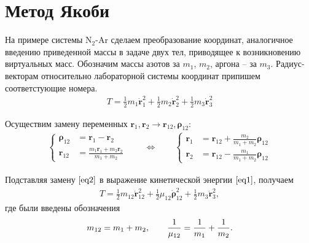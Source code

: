 \documentclass[14pt]{extarticle}
\newcommand{\dvr}{\dot{\mathbf{r}}}
\newcommand{\vr}{\mathbf{r}}
\newcommand{\vrho}{\boldsymbol{\rho}}
\newcommand{\dvrho}{\dot{\boldsymbol{\rho}}}
\begin{document}
\section*{Метод Якоби}

На примере системы N$_2$-Ar сделаем преобразование координат, аналогичное введению приведенной массы в задаче двух тел, приводящее к возникновению виртуальных масс. Обозначим массы азотов за $m_1$, $m_2$, аргона -- за $m_3$. Радиус-векторам относительно лабораторной системы координат припишем соответстующие номера. 
\begin{gather}
		T = \frac{1}{2} m_1 \dvr_1^2 + \frac{1}{2} m_2 \dvr_2^2 + \frac{1}{2} m_3 \dvr_3^2 \label{eq1}
\end{gather}

Осуществим замену переменных $\vr_1, \vr_2 \longrightarrow \vr_{12}, \vrho_{12}$:
\begin{gather}
	\left\{
	\begin{aligned}
		\vrho_{12} &= \vr_1 - \vr_2 \\
		\vr_{12} &= \frac{m_1 \vr_1 + m_2 \vr_2}{m_1 + m_2} 
	\end{aligned}
	\right. \quad \quad \Longleftrightarrow \quad \quad 
	\left\{
	\begin{aligned}
		\vr_1 &= \vr_{12} + \frac{m_2}{m_1 + m_2} \vrho_{12} \\
		\vr_2 &= \vr_{12} - \frac{m_1}{m_1 + m_2} \vrho_{12} 
	\end{aligned}
	\right. \label{eq2}
\end{gather}

Подставляя замену $\eqref{eq2}$ в выражение кинетической энергии $\eqref{eq1}$, получаем
\begin{gather}
	T = \frac{1}{2} m_{12} \dvr_{12}^2 + \frac{1}{2} \mu_{12} \dvrho_{12}^2 + \frac{1}{2} m_3 \dvr_{3}^2, \label{eq3}
\end{gather}
где были введены обозначения
\begin{gather}
	m_{12} = m_1 + m_2, \quad \quad \frac{1}{\mu_{12}} = \frac{1}{m_1} + \frac{1}{m_2}. \notag
\end{gather}
 
\end{document}
